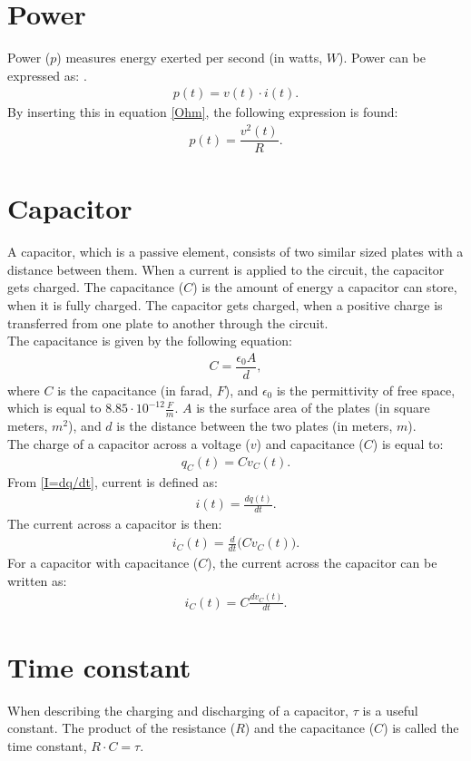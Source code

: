 \section{Power} 
Power ($p$) measures energy exerted per second (in watts, $W$). Power can be expressed as: \cite[p. 22]{bcircuit5}.
\begin{align} 
\label{power}
p(t)=v(t)\cdot i(t).
\end{align}
By inserting this in equation \eqref{Ohm}, the following expression is found:
\begin{align}
p(t)=\dfrac{v^2(t)}{R}. \label{resistor:power}
\end{align}

\section{Capacitor}
A capacitor, which is a passive element, consists of two similar sized plates with a distance between them. When a current is applied to the circuit, the capacitor gets charged. The capacitance ($C$) is the amount of energy a capacitor can store, when it is fully charged. The capacitor gets charged, when a positive charge is transferred from one plate to another through the circuit.
\\
The capacitance is given by the following equation:
\begin{align*}
C=\dfrac{\epsilon_{0}A}{d},
\end{align*}
where $C$ is the capacitance (in farad, $F$), and $\epsilon_{0}$ is the permittivity of free space, which is equal to $8.85 \cdot 10^{-12}                                                 \frac{F}{m}$. $A$ is the surface area of the plates (in square meters, $m^{2}$), and $d$ is the distance between the two plates (in meters, $m$).
\\
The charge of a capacitor across a voltage ($v$) and capacitance ($C$) is equal to: \cite[p.~253]{bcircuit5}
\begin{align}
\label{QCV}
q_C(t) = Cv_C(t).	
\end{align}
From \eqref{I=dq/dt}, current is defined as:
\begin{align*}
	i(t) = \frac{dq(t)}{dt}.
\end{align*}
The current across a capacitor is then:
\begin{align*}
	i_C(t) = \frac{d}{dt}\big(Cv_C(t)\big).
\end{align*}
For a capacitor with capacitance ($C$), the current across the capacitor can be written as:
\begin{align}
	i_C(t) = C\frac{dv_C(t)}{dt}.\label{iC}
\end{align}
\section{Time constant}
When describing the charging and discharging of a capacitor, $\tau$ is a useful constant. The product of the resistance ($R$) and the capacitance ($C$) is called the time constant, $R \cdot C = \tau$.